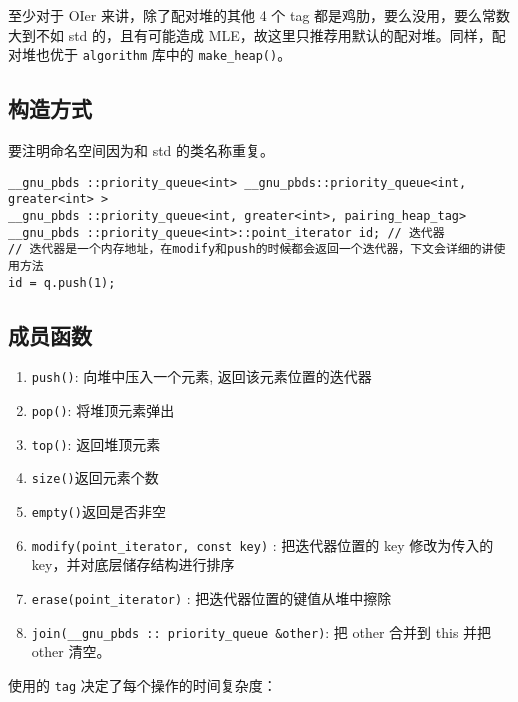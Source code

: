 至少对于 OIer 来讲，除了配对堆的其他 4 个 tag 都是鸡肋，要么没用，要么常数大到不如 std 的，且有可能造成 MLE，故这里只推荐用默认的配对堆。同样，配对堆也优于 \texttt{algorithm} 库中的 \texttt{make\_heap()}。

\subsection{构造方式}

要注明命名空间因为和 std 的类名称重复。

\begin{verbatim}
__gnu_pbds ::priority_queue<int> __gnu_pbds::priority_queue<int, greater<int> >
__gnu_pbds ::priority_queue<int, greater<int>, pairing_heap_tag>
__gnu_pbds ::priority_queue<int>::point_iterator id; // 迭代器
// 迭代器是一个内存地址，在modify和push的时候都会返回一个迭代器，下文会详细的讲使用方法
id = q.push(1);
\end{verbatim}

\subsection{成员函数}

\begin{enumerate}
\item \texttt{push()}: 向堆中压入一个元素, 返回该元素位置的迭代器
\item \texttt{pop()}: 将堆顶元素弹出
\item \texttt{top()}: 返回堆顶元素
\item \texttt{size()}返回元素个数
\item \texttt{empty()}返回是否非空
\item \texttt{modify(point\_iterator, const key)} : 把迭代器位置的 key 修改为传入的 key，并对底层储存结构进行排序
\item \texttt{erase(point\_iterator)} : 把迭代器位置的键值从堆中擦除
\item \texttt{join(\_\_gnu\_pbds :: priority\_queue \&other)}: 把 other 合并到  this 并把 other 清空。
\end{enumerate}

使用的 \texttt{tag} 决定了每个操作的时间复杂度：

